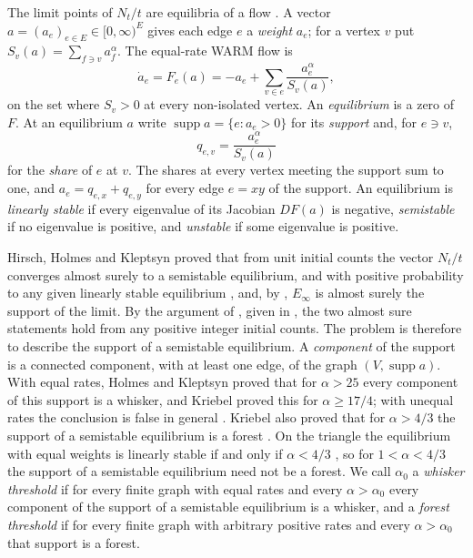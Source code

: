 \documentclass[11pt]{article}
\theoremstyle{definition}
\theoremstyle{remark}
\DeclareMathOperator{\supp}{supp}
\begin{document}
The limit points of $N_t/t$ are equilibria of a flow \cite[Theorem~1]{HHK}. A vector $a=(a_e)_{e\in E}\in[0,\infty)^E$ gives each edge $e$ a
\emph{weight} $a_e$; for a vertex $v$ put $S_v(a)=\sum_{f\ni v}a_f^\alpha$. The equal-rate WARM flow is
\begin{equation}\label{eq:flow}
  \dot a_e=F_e(a)=-a_e+\sum_{v\in e}\frac{a_e^\alpha}{S_v(a)} ,
\end{equation}
on the set where $S_v>0$ at every non-isolated vertex. An \emph{equilibrium} is a zero of $F$. At an equilibrium $a$
write $\supp a=\{e: a_e>0\}$ for its \emph{support} and, for $e\ni v$,
\[
  q_{e,v}=\frac{a_e^\alpha}{S_v(a)}
\]
for the \emph{share} of $e$ at $v$. The shares at every vertex meeting the support sum to one, and
$a_e=q_{e,x}+q_{e,y}$ for every edge $e=xy$ of the support. An equilibrium is \emph{linearly stable} if every
eigenvalue of its Jacobian $DF(a)$ is negative, \emph{semistable} if no eigenvalue is positive, and \emph{unstable}
if some eigenvalue is positive.

Hirsch, Holmes and Kleptsyn proved that from unit initial counts the vector $N_t/t$ converges almost surely to a
semistable equilibrium, and with positive probability to any given linearly stable equilibrium
\cite[Theorem~1]{HHK}, and, by \cite[Proposition~1]{HHK}, $E_\infty$ is almost surely the support of the limit. By
the argument of \cite[Lemma~2]{Kr}, given in , the two almost sure statements hold from any positive
integer initial counts. The problem is
therefore to describe the support of a semistable equilibrium. A \emph{component} of the support is a connected
component, with at least one edge, of the graph $(V,\supp a)$. With equal rates, Holmes and Kleptsyn
\cite[Theorem~2(a)]{HK} proved that for $\alpha>25$ every component of this support is a whisker, and Kriebel
\cite[Section~4]{Kr} proved this for $\alpha\ge 17/4$; with unequal rates the conclusion is false in general
\cite[Example~1]{HK}. Kriebel also proved that for $\alpha>4/3$ the support of a semistable equilibrium is a forest
\cite[Theorem~3]{Kr}. On the triangle the equilibrium with equal weights is linearly stable if and only if
$\alpha<4/3$ \cite[Theorem~3.8]{vdHHKR}, so for $1<\alpha<4/3$ the support of a semistable equilibrium need not
be a forest. We call $\alpha_0$ a \emph{whisker threshold} if for every finite graph with equal rates and every
$\alpha>\alpha_0$ every component of the support of a semistable equilibrium is a whisker, and a \emph{forest
threshold} if for every finite graph with arbitrary positive rates and every $\alpha>\alpha_0$ that support is a
forest.
\end{document}
